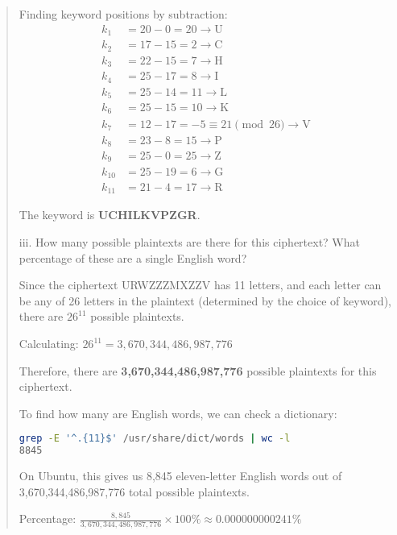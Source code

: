 \documentclass[12pt]{article}
\begin{document}
\begin{quote}
\vspace{0.3cm}

Finding keyword positions by subtraction:
\begin{align*}
k_1 &= 20 - 0 = 20 \rightarrow \text{U}\\
k_2 &= 17 - 15 = 2 \rightarrow \text{C}\\
k_3 &= 22 - 15 = 7 \rightarrow \text{H}\\
k_4 &= 25 - 17 = 8 \rightarrow \text{I}\\
k_5 &= 25 - 14 = 11 \rightarrow \text{L}\\
k_6 &= 25 - 15 = 10 \rightarrow \text{K}\\
k_7 &= 12 - 17 = -5 \equiv 21 \pmod{26} \rightarrow \text{V}\\
k_8 &= 23 - 8 = 15 \rightarrow \text{P}\\
k_9 &= 25 - 0 = 25 \rightarrow \text{Z}\\
k_{10} &= 25 - 19 = 6 \rightarrow \text{G}\\
k_{11} &= 21 - 4 = 17 \rightarrow \text{R}
\end{align*}

The keyword is \textbf{UCHILKVPZGR}.

\vspace{0.5cm}

iii. How many possible plaintexts are there for this ciphertext? What percentage of these are a single English word?

\vspace{0.3cm}

Since the ciphertext URWZZZMXZZV has 11 letters, and each letter can be any of 26 letters in the plaintext (determined by the choice of keyword), there are $26^{11}$ possible plaintexts.

\vspace{0.3cm}

Calculating: $26^{11} = 3,670,344,486,987,776$

\vspace{0.3cm}

Therefore, there are \textbf{3,670,344,486,987,776} possible plaintexts for this ciphertext.

\vspace{0.3cm}

To find how many are English words, we can check a dictionary:

\begin{lstlisting}[language=bash]
grep -E '^.{11}$' /usr/share/dict/words | wc -l
8845
\end{lstlisting}

On Ubuntu, this gives us 8,845 eleven-letter English words out of 3,670,344,486,987,776 total possible plaintexts.

\vspace{0.3cm}

Percentage: $\frac{8,845}{3,670,344,486,987,776} \times 100\% \approx 0.000000000241\%$

\end{quote}
\end{document}
